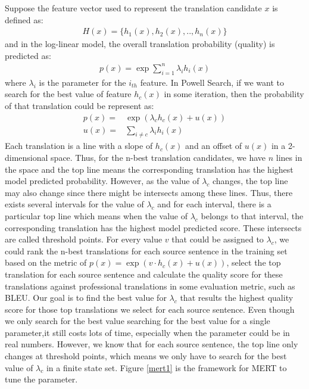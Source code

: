 Suppose the feature vector used to represent the translation candidate $x$ is defined as:\\
\begin{align}
H(x) = \{h_1(x),h_2(x),..,h_n(x)\}
\end{align}
and in the log-linear model, the overall translation probability (quality) is predicted as:
\begin{align}
p(x) = \exp\sum_{i=1}^{n}\lambda_ih_i(x)
\end{align}
where $\lambda_i$ is the parameter for the $i_{th}$ feature. In Powell Search, if we want to search for the best value of feature $h_c(x)$ in some iteration, then the probability of that translation could be represent as:
\begin{align}
p(x) =& \exp (\lambda_{c}h_c(x)+u(x))\\
u(x) =&\sum_{i \neq c} \lambda_i h_i(x)
\end{align}
Each translation is a line with a slope of $h_c(x)$ and an offset of $u(x)$ in a 2-dimensional space. Thus, for the n-best translation candidates, we have $n$ lines in the space and the top line means the corresponding translation has the highest model predicted probability. However, as the value of $\lambda_c$ changes, the top line may also change since there might be intersects among these lines. Thus, there exists several intervals for the value of $\lambda_c$ and for each interval, there is a particular top line which means when the value of $\lambda_c$ belongs to that interval, the corresponding translation has the highest model predicted score.  These intersects are called threshold points. 
For every value $v$ that could be assigned to $\lambda_c$, we could rank the n-best translations for each source sentence in the training set based on the metric of $p(x) = \exp (v\cdot h_c(x)+u(x))$, select the top translation for each source sentence and calculate the quality score for these translations against professional translations in some evaluation metric, such as BLEU. Our goal is to find the best value for $\lambda_c$ that results the highest quality score for those top translations we select for each source sentence. Even though we only search for the best value searching for the best value for a single parameter,it still costs lots of time, especially when the parameter could be in real numbers. However, we know that for each source sentence, the top line only changes at threshold points, which means we only have to search for the best value of $\lambda_c$ in a finite state set. Figure \ref{mert1} is the framework \cite{koehn2009statistical} for MERT to tune the parameter.
